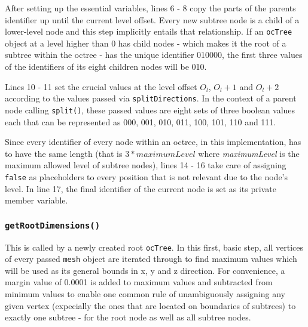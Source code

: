 After setting up the essential variables, lines 6 - 8 copy the parts of the parents identifier up until the current level offset. Every new subtree node is a child of a lower-level node and this step implicitly entails that relationship. If an \texttt{ocTree} object at a level higher than 0 has child nodes - which makes it the root of a subtree within the octree - has the unique identifier 010000, the first three values of the identifiers of its eight children nodes will be 010.

Lines 10 - 11 set the crucial values at the level offset $O_l$, $O_l+1$ and $O_l+2$ according to the values passed via \texttt{splitDirections}. In the context of a parent node calling \texttt{split()}, these passed values are eight sets of three boolean values each that can be represented as 000, 001, 010, 011, 100, 101, 110 and 111.

Since every identifier of every node within an octree, in this implementation, has to have the same length (that is $3*maximumLevel$ where \textit{maximumLevel} is the maximum allowed level of subtree nodes), lines 14 - 16 take care of assigning \texttt{false} as placeholders to every position that is not relevant due to the node's level. In line 17, the final identifier of the current node is set as its private member variable.

	\subsubsection{\texttt{getRootDimensions()}}
This is called by a newly created root \texttt{ocTree}. In this first, basic step, all vertices of every passed \texttt{mesh} object are iterated through to find maximum values which will be used as its general bounds in x, y and z direction. For convenience, a margin value of 0.0001 is added to maximum values and subtracted from minimum values to enable one common rule of unambiguously assigning any given vertex (expecially the ones that are located on boundaries of subtrees) to exactly one subtree - for the root node as well as all subtree nodes.

